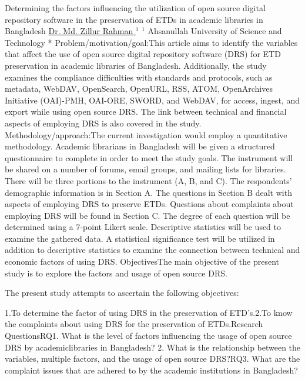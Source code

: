 
    \begin{abstract_online}{Determining the factors influencing the utilization of open source digital repository software in the preservation of ETDs in academic libraries in Bangladesh}{%
        \underline{ Dr. Md. Zillur Rahman }$^{1}$}{%
        }{%
        $^1$  Ahsanullah University of Science and Technology *\newline{}
            }
	Problem/motivation/goal:This article aims to identify the variables that affect the use of open source digital repository software (DRS) for ETD preservation in academic libraries of Bangladesh. Additionally, the study examines the compliance difficulties with standards and protocols, such as metadata, WebDAV, OpenSearch, OpenURL, RSS, ATOM, OpenArchives Initiative (OAI)-PMH, OAI-ORE, SWORD, and WebDAV, for access, ingest, and export while using open source DRS. The link between technical and financial aspects of employing DRS is also covered in the study. Methodology/approach:The current investigation would employ a quantitative methodology. Academic librarians in Bangladesh will be given a structured questionnaire to complete in order to meet the study goals. The instrument will be shared on a number of forums, email groups, and mailing lists for libraries. There will be three portions to the instrument (A, B, and C). The respondents' demographic information is in Section A. The questions in Section B dealt with aspects of employing DRS to preserve ETDs. Questions about complaints about employing DRS will be found in Section C. The degree of each question will be determined using a 7-point Likert scale. Descriptive statistics will be used to examine the gathered data. A statistical significance test will be utilized in addition to descriptive statistics to examine the connection between technical and economic factors of using DRS. ObjectivesThe main objective of the present study is to explore the factors and usage of open source DRS. 
	
	The present study attempts to ascertain the following objectives:
	
	1.To determine the factor of using DRS in the preservation of ETD’s.2.To know the complaints about using DRS for the preservation of ETDs.Research QuestionsRQ1. What is the level of factors influencing the usage of open source DRS by academiclibraries in Bangladesh?
	2. What is the relationship between the variables, multiple factors, and the usage of open source DRS?RQ3. What are the complaint issues that are adhered to by the academic institutions in Bangladesh?
	

\end{abstract_online}
